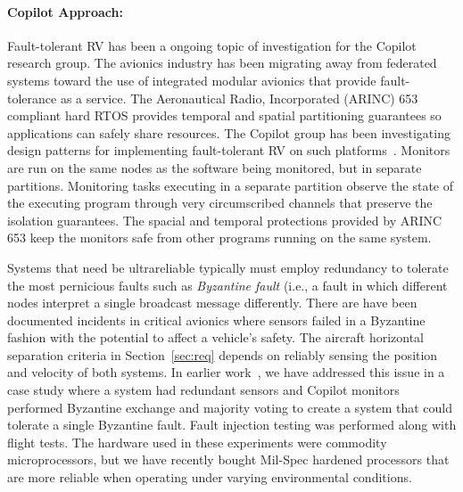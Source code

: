 \paragraph{Copilot Approach:} Fault-tolerant RV has been a ongoing
topic of investigation for the Copilot research group. The avionics
industry has been migrating away from federated systems toward the use
of integrated modular avionics that provide fault-tolerance as a
service.  The Aeronautical Radio, Incorporated (ARINC)
653~\cite{ARINC653} compliant hard  RTOS
provides temporal and spatial partitioning guarantees so applications
can safely share resources.  The Copilot group has been investigating
design patterns for implementing fault-tolerant RV on such
platforms~\cite{Kaveh15}. Monitors are run on the same nodes as the
software being monitored, but in separate partitions. Monitoring tasks
executing in a separate partition observe the state of the executing
program through very circumscribed
channels that preserve the isolation guarantees.  The spacial and
temporal protections provided by ARINC 653 keep the monitors safe from
other programs running on the same system.

Systems that need be ultrareliable typically must employ redundancy to
tolerate the most pernicious faults such as \emph{Byzantine fault}
(i.e., a fault in which different nodes interpret a single broadcast
message differently.  There are have been  documented incidents in
critical avionics  where sensors failed in a Byzantine fashion with
the potential to affect a vehicle's safety.  The aircraft horizontal separation criteria in
Section~\ref{sec:req} depends on reliably sensing the position and
velocity of both systems. In earlier work~\cite{pike-isse-13}, we have
 addressed this issue in a case study where a system had
redundant sensors and Copilot monitors performed Byzantine exchange and 
majority voting to create a system that could tolerate a single
Byzantine fault.  Fault injection testing was
performed along with flight tests.  The hardware used in these
experiments were commodity microprocessors, but we have recently
bought Mil-Spec hardened processors that are more reliable when operating
under varying environmental conditions.




